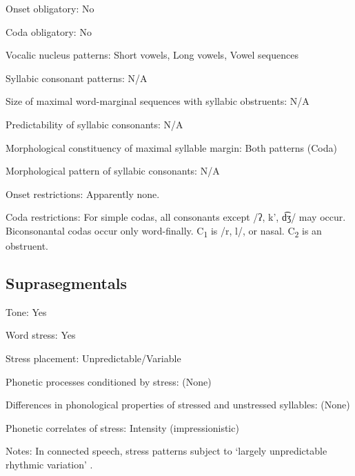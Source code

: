{\begin{appendixdesc}
\item[Onset obligatory:] No

\item[Coda obligatory:] No

\item[Vocalic nucleus patterns:] Short vowels, Long vowels, Vowel sequences

\item[Syllabic consonant patterns:] N/A

\item[Size of maximal word-marginal sequences with syllabic obstruents:] N/A

\item[Predictability of syllabic consonants:] N/A

\item[Morphological constituency of maximal syllable margin:] Both patterns (Coda)

\item[Morphological pattern of syllabic consonants:] N/A

\item[Onset restrictions:] Apparently none.

\item[Coda restrictions:] For simple codas, all consonants except /ʔ, k’, d͡ʒ/ may occur. Biconsonantal codas occur only word-finally. C\textsubscript{1} is /r, l/, or nasal. C\textsubscript{2} is an obstruent.
\end{appendixdesc}
\subsection*{Suprasegmentals}
\begin{appendixdesc}
\item[Tone:] Yes

\item[Word stress:] Yes

\item[Stress placement:] Unpredictable/Variable

\item[Phonetic processes conditioned by stress:] (None)

\item[Differences in phonological properties of stressed and unstressed syllables:] (None)

\item[Phonetic correlates of stress:] Intensity (impressionistic)

\item[Notes:] In connected speech, stress patterns subject to ‘largely unpredictable rhythmic variation’ \citep[12--13]{Crewe1975}.
\end{appendixdesc}
}
